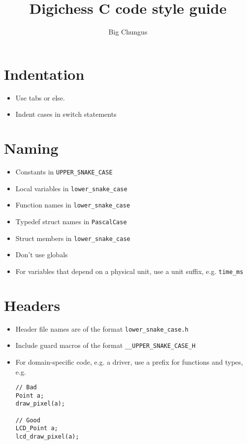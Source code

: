 \documentclass{article}
\title{Digichess C code style guide}
\author{Big Chungus}
\begin{document}
\maketitle

\section{Indentation}

\begin{itemize}
	\item Use tabs or else.
	\item Indent cases in switch statements
\end{itemize}

\section{Naming}

\begin{itemize}
	\item Constants in \lstinline{UPPER_SNAKE_CASE}
	\item Local variables in \lstinline{lower_snake_case}
	\item Function names in \lstinline{lower_snake_case}
	\item Typedef struct names in \lstinline{PascalCase}
	\item Struct members in \lstinline{lower_snake_case}
	\item Don't use globals
	\item For variables that depend on a physical unit, use a unit suffix, e.g. \lstinline{time_ms}
\end{itemize}

\section{Headers}

\begin{itemize}
	\item Header file names are of the format \lstinline{lower_snake_case.h}
	\item Include guard macros of the format \lstinline{__UPPER_SNAKE_CASE_H}
	\item For domain-specific code, e.g. a driver, use a prefix for functions and types, e.g.
	
	\begin{lstlisting}
// Bad
Point a;
draw_pixel(a);

// Good
LCD_Point a;
lcd_draw_pixel(a);
	\end{lstlisting}
\end{itemize}
\end{document}
